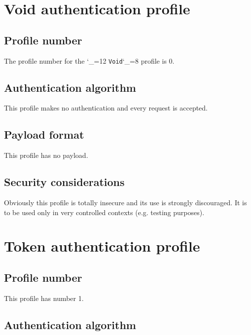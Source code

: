 \documentclass{rfc}
\def\ttt{\catcode`\_=12 \tttii}
\def\tttii#1!{{\tt #1}\catcode`\_=8{}}
\begin{document}
\chapter{Void authentication profile}
\label{chap:0;transport_layer}

\section{Profile number}
\label{sect:0.1;transport_layer}

The profile number for the \ttt Void! profile is 0.

\section{Authentication algorithm}
\label{sect:0.3;transport_layer}

This profile makes no authentication and every request is accepted. 

\section{Payload format}
\label{sect:0.2;transport_layer}

This profile has no payload.


\section{Security considerations}
\label{sect:0.4;transport_layer}

Obviously this profile is totally insecure and its use is strongly
discouraged.  It is to be used only in very controlled contexts
(e.g. testing purposes).


\chapter{Token authentication profile}
\label{chap:1;transport_layer}

\section{Profile number}
\label{sect:1.0;transport_layer}

This profile has number 1.

\section{Authentication algorithm}
\label{sect:1.1;transport_layer}
\end{document}
